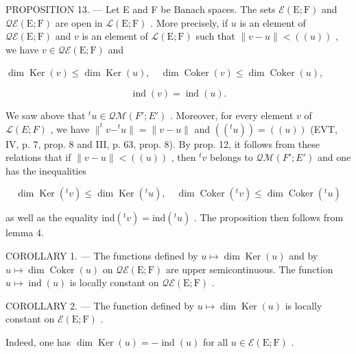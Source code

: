 PROPOSITION 13. --- Let E and F be Banach spaces. The sets \(\mathcal{E}(\mathrm{E};\mathrm{F})\) and \(\mathcal{Q}\mathcal{E}(\mathrm{E};\mathrm{F})\) are open in \(\mathcal{L}(\mathrm{E};\mathrm{F})\) . More precisely, if \(u\) is an element of \(\mathcal{Q}\mathcal{E}(\mathrm{E};\mathrm{F})\) and \(v\) is an element of \(\mathcal{L}(\mathrm{E};\mathrm{F})\) such that \(\| v - u\| < ((u))\) , we have \(v \in \mathcal{Q}\mathcal{E}(\mathrm{E};\mathrm{F})\) and

\(\dim \operatorname{Ker}(v) \leqslant \dim \operatorname{Ker}(u), \quad \dim \operatorname{Coker}(v) \leqslant \dim \operatorname{Coker}(u),\)

\[
\operatorname{ind} (v) = \operatorname{ind} (u).
\]

We saw above that \(^{t}u \in \mathcal{Q}\mathcal{M}(F';E')\) . Moreover, for every element \(v\) of \(\mathcal{L}(E;F)\) , we have \(\|^{t}v - ^{t}u\| = \|v - u\|\) and \(((^{t}u)) = ((u))\) (EVT, IV, p. 7, prop. 8 and III, p. 63, prop. 8). By prop. 12, it follows from these relations that if \(\|v - u\| < ((u))\) , then \(^{t}v\) belongs to \(\mathcal{Q}\mathcal{M}(F';E')\) and one has the inequalities

\[
\dim \operatorname{Ker} (^ {t} v) \leqslant \dim \operatorname{Ker} (^ {t} u), \quad \dim \operatorname{Coker} (^ {t} v) \leqslant \dim \operatorname{Coker} (^ {t} u)
\]

as well as the equality \(\mathrm{ind}(^{t}v)=\mathrm{ind}(^{t}u)\) . The proposition then follows from lemma 4.

COROLLARY 1. --- The functions defined by \(u \mapsto \dim \operatorname{Ker}(u)\) and by \(u \mapsto \dim \operatorname{Coker}(u)\) on \(\mathcal{Q}\mathcal{E}(\mathrm{E};\mathrm{F})\) are upper semicontinuous. The function \(u \mapsto \operatorname{ind}(u)\) is locally constant on \(\mathcal{Q}\mathcal{E}(\mathrm{E};\mathrm{F})\) .

COROLLARY 2. --- The function defined by \(u \mapsto \dim \operatorname{Ker}(u)\) is locally constant on \(\mathcal{E}(\mathrm{E};\mathrm{F})\) .

Indeed, one has \(\dim \operatorname{Ker}(u) = -\operatorname{ind}(u)\) for all \(u \in \mathcal{E}(\mathrm{E};\mathrm{F})\) .

